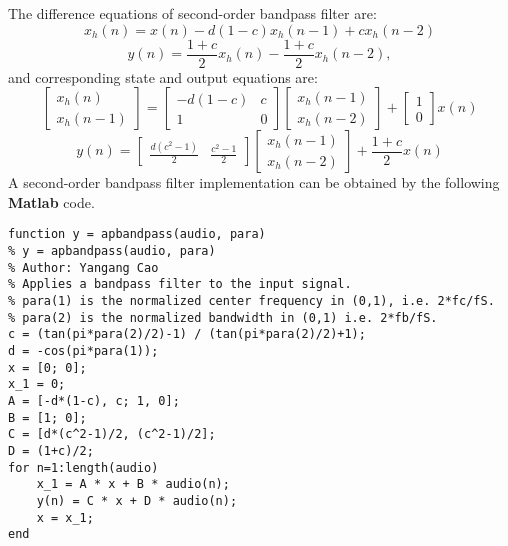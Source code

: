 \documentclass[10pt,a4paper,oneside]{article}
\begin{document}
The difference equations of second-order bandpass filter are: 
\[
x_h(n) = x(n) - d(1-c)x_h(n-1) + cx_h(n-2)
\]
\[
y(n) = \frac{1+c}{2}x_h(n) - \frac{1+c}{2}x_h(n-2),
\]
and corresponding state and output equations are:
\[
\begin{bmatrix}x_h(n)\\x_h(n-1)\end{bmatrix} = \begin{bmatrix}
-d(1-c)&c\\
1&0
\end{bmatrix}
\begin{bmatrix}x_h(n-1)\\x_h(n-2)\end{bmatrix} + \begin{bmatrix}1\\0\end{bmatrix}
x(n)\]
\[
y(n) = \begin{bmatrix}\frac{d(c^2-1)}{2}&\frac{c^2-1}{2}\end{bmatrix}
\begin{bmatrix}x_h(n-1)\\x_h(n-2)\end{bmatrix} + \frac{1+c}{2}x(n)
\]
A second-order bandpass filter implementation can be obtained by the following {\bfseries Matlab} code.
\begin{lstlisting}
function y = apbandpass(audio, para)
% y = apbandpass(audio, para)
% Author: Yangang Cao
% Applies a bandpass filter to the input signal.
% para(1) is the normalized center frequency in (0,1), i.e. 2*fc/fS.
% para(2) is the normalized bandwidth in (0,1) i.e. 2*fb/fS.
c = (tan(pi*para(2)/2)-1) / (tan(pi*para(2)/2)+1);
d = -cos(pi*para(1));
x = [0; 0];
x_1 = 0;
A = [-d*(1-c), c; 1, 0];
B = [1; 0];
C = [d*(c^2-1)/2, (c^2-1)/2];
D = (1+c)/2;
for n=1:length(audio)
	x_1 = A * x + B * audio(n);
	y(n) = C * x + D * audio(n);
	x = x_1;
end
\end{lstlisting}
\end{document}
